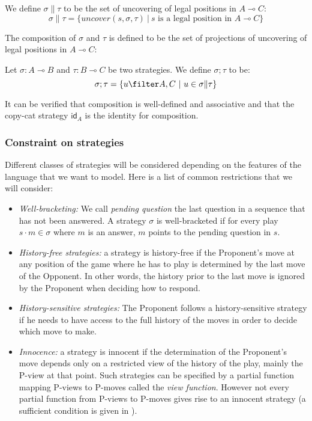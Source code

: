 We define $\sigma \| \tau $ to be the set of uncovering of legal
positions in $A \multimap C$:
$$ \sigma \| \tau = \{ uncover(s, \sigma, \tau) \ | \ s \mbox{ is a legal position in } A \multimap C \}$$

The composition of $\sigma$ and $\tau$ is defined to be the set of
projections of uncovering of legal positions in $A \multimap C$:

\begin{definition}
Let $\sigma : A \multimap B$ and  $\tau : B \multimap C$ be two
strategies. We define $\sigma ; \tau$ to be:
$$ \sigma ; \tau = \{ u \filter A,C \ | \ u \in \sigma \|
\tau \}$$
\end{definition}

It can be verified that composition is well-defined and associative \citep{hylandong_pcf} and that the copy-cat strategy $\textsf{id}_A$ is the identity for composition.

\subsubsection{Constraint on strategies}

Different classes of strategies will be considered depending on the
features of the language that we want to model. Here is a list of
common restrictions that we will consider:
\begin{itemize}
\item \emph{Well-bracketing:}
We call \emph{pending question} the last question in a sequence that has not been answered.
A strategy $\sigma$ is well-bracketed if for every play $s \cdot m \in \sigma$ where $m$ is an answer, $m$ points to the pending question in $s$.

\item \emph{History-free strategies:} a strategy is history-free if the Proponent's move at any position of the game where he has to play
is determined by the last move of the Opponent. In other words, the
history prior to the last move is ignored by the Proponent when
deciding how to respond.

\item \emph{History-sensitive strategies:} The Proponent follows a history-sensitive strategy if he needs to have access to the full
history of the moves in order to decide which move to make.

\item \emph{Innocence:} a strategy is innocent if the determination of the Proponent's move depends
only on a restricted view of the history of the play, mainly the
P-view at that point. Such strategies can be specified by a partial
function mapping P-views to P-moves called the \emph{view function}.
However not every partial function from P-views to P-moves gives
rise to an innocent strategy (a sufficient condition is given in
\cite{hylandong_pcf}).
\end{itemize}

